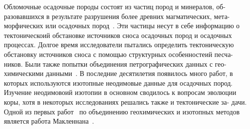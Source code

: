 \documentclass[a4paper,12pt]{article}
\begin{document}
Обломочные осадочные породы состоят из частиц пород и минералов, об- разовавшихся в результате разрушения более древних магматических, мета- морфических или осадочных пород~\parencite{art}.
Эти частицы несут в себе информацию о тектоническоий обстановке источников сноса осадочных пород и осадочных процессах. Долгое время исследователи пытались определить тектоническую обстановку источников сноса с помощью структурных особенностеий песча- ников. Были также попытки объединения петрографических данных с гео- химическими данными~\parencite{batlas}. 
В последние десятилетия появилось много работ, в которых используются изотопные неодимовые данные для осадочных пород. Изучение неодимовоий изотопии в основном сводилось к вопросам эволюции коры, хотя в некоторых исследованиях решались также и тектонические за- дачи. Одной из первых работ~\parencite{ivanov} по объединению геохимических и изотопных методов является работа Макленнана~\parencite{fart}.

\printbibliography[sorting=nyt]
\end{document}
